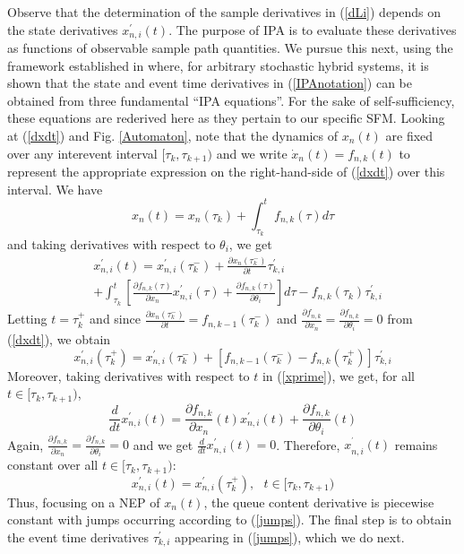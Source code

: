\documentclass{ifacconf}\usepackage{graphicx}
\begin{document}
Observe that the determination of the sample derivatives in (\ref{dLi})
depends on the state derivatives $x_{n,i}^{\prime}(t)$. The purpose of IPA is
to evaluate these derivatives as functions of observable sample path
quantities. We pursue this next, using the framework established in
\cite{Cassandras10} where, for arbitrary stochastic hybrid systems, it is
shown that the state and event time derivatives in (\ref{IPAnotation}) can be
obtained from three fundamental \textquotedblleft IPA
equations\textquotedblright. For the sake of self-sufficiency, these equations
are rederived here as they pertain to our specific SFM. Looking at
(\ref{dxdt}) and Fig. \ref{Automaton}, note that the dynamics of $x_{n}(t)$
are fixed over any interevent interval $[\tau_{k},\tau_{k+1})$ and we write
$\dot{x}_{n}(t)=f_{n,k}(t)$ to represent the appropriate expression on the
right-hand-side of (\ref{dxdt}) over this interval. We have
\[
x_{n}(t)=x_{n}(\tau_{k})+\int\nolimits_{\tau_{k}}^{t}f_{n,k}(\tau)d\tau
\]
and taking derivatives with respect to $\theta_{i}$, we get
\begin{align}
&  x_{n,i}^{\prime}(t)=x_{n,i}^{\prime}(\tau_{k}^{-})+\frac{\partial
x_{n}(\tau_{k}^{-})}{\partial t}\tau_{k,i}^{\prime}\label{xprime}\\
&  +\int\nolimits_{\tau_{k}}^{t}\left[  \frac{\partial f_{n,k}(\tau)}{\partial
x_{n}}x_{n,i}^{\prime}(\tau)+\frac{\partial f_{n,k}(\tau)}{\partial\theta_{i}}\right]  d\tau-f_{n,k}(\tau_{k})\tau_{k,i}^{\prime}\nonumber
\end{align}
Letting $t=\tau_{k}^{+}$ and since $\frac{\partial x_{n}(\tau_{k}^{-})}{\partial t}=f_{n,k-1}(\tau_{k}^{-})$ and $\frac{\partial f_{n,k}}{\partial
x_{n}}=\frac{\partial f_{n,k}}{\partial\theta_{i}}=0$ from (\ref{dxdt}), we
obtain
\begin{equation}
x_{n,i}^{\prime}(\tau_{k}^{+})=x_{n,i}^{\prime}(\tau_{k}^{-})+[f_{n,k-1}(\tau_{k}^{-})-f_{n,k}(\tau_{k}^{+})]\tau_{k,i}^{\prime}\label{jumps}\end{equation}
Moreover, taking derivatives with respect to $t$ in (\ref{xprime}), we get,
for all $t\in\lbrack\tau_{k},\tau_{k+1})$,
\begin{equation}
\frac{d}{dt}x_{n,i}^{\prime}(t)=\frac{\partial f_{n,k}}{\partial x_{n}}(t)x_{n,i}^{\prime}(t)+\frac{\partial f_{n,k}}{\partial\theta_{i}}(t)\label{dxdtdtheta}\end{equation}
Again, $\frac{\partial f_{n,k}}{\partial x_{n}}=\frac{\partial f_{n,k}}{\partial\theta_{i}}=0$ and we get $\frac{d}{dt}x_{n,i}^{\prime}(t)=0$.
Therefore, $x_{n,i}^{^{\prime}}(t)$ remains constant over all $t\in\lbrack
\tau_{k},\tau_{k+1})$:
\begin{equation}
x_{n,i}^{\prime}(t)=x_{n,i}^{\prime}(\tau_{k}^{+}),\text{ \ \ \ }t\in
\lbrack\tau_{k},\tau_{k+1})\label{xprime(t)}\end{equation}
Thus, focusing on a NEP of $x_{n}(t)$, the queue content derivative is
piecewise constant with jumps occurring according to (\ref{jumps}). The final
step is to obtain the event time derivatives $\tau_{k,i}^{\prime}$ appearing
in (\ref{jumps}), which we do next.
\end{document}
